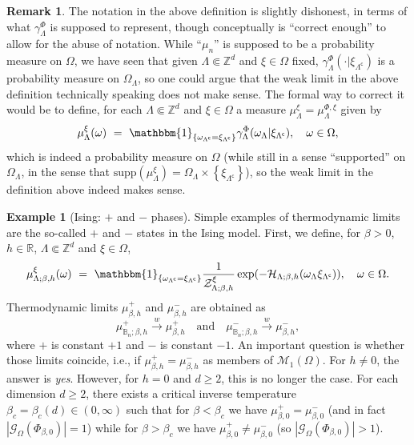 \documentclass[12pt]{article}
\newcommand{\BBB}{\mathbb{B}}
\newcommand{\G}{\mathcal{G}}
\renewcommand{\H}{\mathcal{H}}
\newcommand{\M}{\mathcal{M}}
\newcommand{\R}{\mathbb{R}}
\newcommand{\Z}{\mathbb{Z}}
\newcommand{\ZZ}{\mathcal{Z}}
\newcommand{\set}[1]{\left\{#1\right\}}
\newcommand{\pika}{\boldsymbol{\cdot}}
\newcommand{\1}{\mathbbm{1}}
\renewcommand{\c}{\mathsf{c}}
\newcommand{\supp}{\mathrm{supp}}
\newcommand{\5}{\vspace{0.5cm}}
\theoremstyle{definition}
\newtheorem{ex}[thm]{Example}
\newtheorem{rem}[thm]{Remark}
\begin{document}
\begin{rem}\label{rem:InfVol}
The notation in the above definition is slightly dishonest, in terms of what $\gamma_\Lambda^\Phi$ is supposed to represent, though conceptually is ``correct enough'' to allow for the abuse of notation. While ``$\mu_n$'' is supposed to be a probability measure on $\Omega$, we have seen that given $\Lambda\Subset\Z^d$ and $\xi\in\Omega$ fixed, $\gamma_\Lambda^\Phi(\pika|\xi_{\Lambda^\c})$ is a probability measure on $\Omega_\Lambda$, so one could argue that the weak limit in the above definition technically speaking does not make sense. The formal way to correct it would be to define, for each $\Lambda\Subset\Z^d$ and $\xi\in\Omega$ a measure $\mu_\Lambda^\xi=\mu_\Lambda^{\Phi,\xi}$ given by
$$\mu_\Lambda^\xi(\omega) ~=~ \1_{\set{\omega_{\Lambda^\c}=\xi_{\Lambda^\c}}}\gamma_\Lambda^\Phi(\omega_\Lambda|\xi_{\Lambda^\c}), \quad \omega\in\Omega,$$
which is indeed a probability measure on $\Omega$ (while still in a sense ``supported'' on $\Omega_\Lambda$, in the sense that $\supp(\mu_\Lambda^\xi)=\Omega_\Lambda\times\set{\xi_{\Lambda^\c}}$), so the weak limit in the definition above indeed makes sense.
\end{rem}

\begin{ex}[Ising: $+$ and $-$ phases]
Simple examples of thermodynamic limits are the so-called $+$ and $-$ states in the Ising model. First, we define, for $\beta>0$, $h\in\R$, $\Lambda\Subset\Z^d$ and $\xi\in\Omega$,
$$\mu_{\Lambda;\beta,h}^\xi(\omega) ~=~ \1_{\set{\omega_{\Lambda^\c}=\xi_{\Lambda^\c}}}\frac{1}{\ZZ_{\Lambda;\beta,h}^\xi}\exp(-\H_{\Lambda;\beta,h}(\omega_\Lambda\xi_{\Lambda^\c})), \quad \omega\in\Omega.$$
Thermodynamic limits $\mu_{\beta,h}^{+}$ and $\mu_{\beta,h}^{-}$ are obtained as 
$$\mu_{\BBB_n;\beta,h}^+\xrightarrow{w}\mu_{\beta,h}^+ \quad\text{and}\quad \mu_{\BBB_n;\beta,h}^-\xrightarrow{w}\mu_{\beta,h}^-,$$
where $+$ is constant $+1$ and $-$ is constant $-1$. An important question is whether those limits coincide, i.e., if $\mu_{\beta,h}^+=\mu_{\beta,h}^-$ as members of $\M_1(\Omega)$. For $h\neq 0$, the answer is \textit{yes}. However, for $h=0$ and $d\geq 2$, this is no longer the case. For each dimension $d\geq 2$, there exists a critical inverse temperature $\beta_c=\beta_c(d)\in(0,\infty)$ such that for $\beta<\beta_c$ we have $\mu_{\beta,0}^+=\mu_{\beta,0}^-$ (and in fact $|\G_\Omega(\Phi_{\beta,0})|=1$) while for $\beta>\beta_c$ we have $\mu_{\beta,0}^+\neq\mu_{\beta,0}^-$ (so $|\G_{\Omega}(\Phi_{\beta,0})|>1$).
\end{ex}
\end{document}
